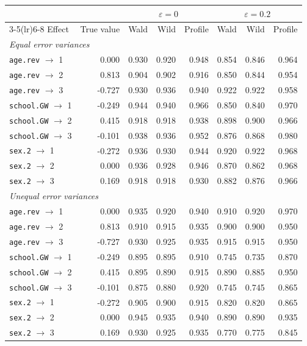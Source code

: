\begin{tabular}{lrrrrrrr}
\toprule
& & \multicolumn{3}{c}{$\varepsilon=0$} & \multicolumn{3}{c}{$\varepsilon=0.2$} \\
\cmidrule(lr){3-5}\cmidrule(lr){6-8}
Effect & True value & Wald & Wild & Profile & Wald & Wild & Profile \\
\midrule
\multicolumn{8}{l}{\emph{Equal error variances}} \\
\texttt{age.rev} $\to$ 1 & 0.000 & 0.930 & 0.920 & 0.948 & 0.854 & 0.846 & 0.964 \\
\texttt{age.rev} $\to$ 2 & 0.813 & 0.904 & 0.902 & 0.916 & 0.850 & 0.844 & 0.954 \\
\texttt{age.rev} $\to$ 3 & -0.727 & 0.930 & 0.936 & 0.940 & 0.922 & 0.922 & 0.958 \\
\texttt{school.GW} $\to$ 1 & -0.249 & 0.944 & 0.940 & 0.966 & 0.850 & 0.840 & 0.970 \\
\texttt{school.GW} $\to$ 2 & 0.415 & 0.918 & 0.918 & 0.938 & 0.898 & 0.900 & 0.966 \\
\texttt{school.GW} $\to$ 3 & -0.101 & 0.938 & 0.936 & 0.952 & 0.876 & 0.868 & 0.980 \\
\texttt{sex.2} $\to$ 1 & -0.272 & 0.936 & 0.930 & 0.944 & 0.920 & 0.922 & 0.968 \\
\texttt{sex.2} $\to$ 2 & 0.000 & 0.936 & 0.928 & 0.946 & 0.870 & 0.862 & 0.968 \\
\texttt{sex.2} $\to$ 3 & 0.169 & 0.918 & 0.918 & 0.930 & 0.882 & 0.876 & 0.966 \\
\midrule
\multicolumn{8}{l}{\emph{Unequal error variances}} \\
\texttt{age.rev} $\to$ 1 & 0.000 & 0.935 & 0.920 & 0.940 & 0.910 & 0.920 & 0.970 \\
\texttt{age.rev} $\to$ 2 & 0.813 & 0.910 & 0.915 & 0.935 & 0.900 & 0.900 & 0.950 \\
\texttt{age.rev} $\to$ 3 & -0.727 & 0.930 & 0.925 & 0.935 & 0.915 & 0.915 & 0.950 \\
\texttt{school.GW} $\to$ 1 & -0.249 & 0.895 & 0.895 & 0.910 & 0.745 & 0.735 & 0.870 \\
\texttt{school.GW} $\to$ 2 & 0.415 & 0.895 & 0.890 & 0.915 & 0.890 & 0.885 & 0.950 \\
\texttt{school.GW} $\to$ 3 & -0.101 & 0.875 & 0.880 & 0.920 & 0.745 & 0.745 & 0.865 \\
\texttt{sex.2} $\to$ 1 & -0.272 & 0.905 & 0.900 & 0.915 & 0.820 & 0.820 & 0.865 \\
\texttt{sex.2} $\to$ 2 & 0.000 & 0.945 & 0.935 & 0.940 & 0.890 & 0.890 & 0.935 \\
\texttt{sex.2} $\to$ 3 & 0.169 & 0.930 & 0.925 & 0.935 & 0.770 & 0.775 & 0.845 \\
\bottomrule
\end{tabular}
